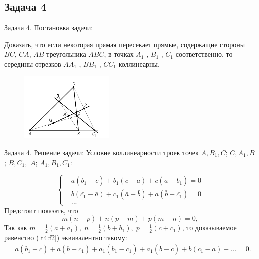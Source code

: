 \documentclass{beamer}
\begin{document}
\begin{frame}
   \subsection{Задача 4}
   \begin{block}{Задача 4. Постановка задачи:}


      Доказать, что если некоторая прямая пересекает прямые, содержащие стороны \(BC\), \(CA\), \(AB\) треугольника \(ABC\), в точках \(A_1\) , \(B_1\) , \(C_1\) соответственно, то середины отрезков \(AA_1\) , \(BB_1\) , \(CC_1\) коллинеарны.

      \begin{figure}[h]
         \centering
         \includegraphics[width=0.4\textwidth]{images/task4.png}
         \label{task4}
      \end{figure}
   \end{block}
\end{frame}

\begin{frame}
   \begin{block}{Задача 4. Решение задачи:}
      Условие коллинеарности троек точек \(A, B_1, C\); \(C,
      A_1, B\); \(B, C_1,\) \(A\); \(A_1, B_1, C_1\):

      \begin{equation}
         \left\{ \begin{aligned}
             & a(\bar{b_1} - \bar{c}) + b_1(\bar{c} - \bar{a}) + c(\bar{a} - \bar{b_1}) = 0 \\
             & b(\bar{c_1} - \bar{a}) + c_1(\bar{a} - \bar{b}) + a(\bar{b} - \bar{c_1}) = 0 \\
             & ...
         \end{aligned}
         \right. \label{t4:f1}
      \end{equation}
      Предстоит показать, что
      \begin{equation}
         m(\bar{n} -\bar{p})+n(\bar{p}-\bar{m})+p(\bar{m}-\bar{n})=0,
         \label{t4:f2}
      \end{equation}
      Так как \(\displaystyle
      m=\frac{1}{2}(a+a_1),\;
      n=\frac{1}{2}(b+b_1),\;
      p=\frac{1}{2}(c+c_1)
      \), то доказываемое равенство (\ref{t4:f2}) эквивалентно такому:
      \begin{equation}
         \begin{aligned}
             & a(\bar{b_1} - \bar{c}) + a(\bar{b}- \bar{c_1}) + a_1(\bar{b_1} - \bar{c_1}) + a_1(\bar{b}- \bar{c}) + b(\bar{c_1} - \bar{a}) + ... =0.
         \end{aligned}
         \label{t4:f3}
      \end{equation}
   \end{block}
\end{frame}
\end{document}
